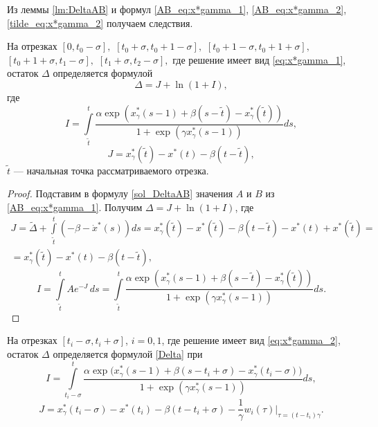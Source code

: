Из леммы \eqref{lm:DeltaAB} и формул \eqref{AB_eq:x*gamma_1}, \eqref{AB_eq:x*gamma_2}, \eqref{tilde_eq:x*gamma_2} получаем следствия.
\begin{corollary}\label{corol_Delta_long}
На отрезках $[0, t_0-\sigma],$ $[t_0+\sigma, t_0+1-\sigma],$ $[t_0+1-\sigma, t_0+1+\sigma],$ $[t_0+1+\sigma, t_1-\sigma],$ $[t_1+\sigma,t_2-\sigma],$ где решение имеет вид \eqref{eq:x*gamma_1}, остаток $\Delta$ определяется формулой
\begin{equation}
    \label{Delta}
    \Delta = J + \ln(1 + I),
\end{equation}
где 
\begin{equation}
    \label{I_long}
    I = \int\limits_{\tilde{t}}^{t}\frac{\alpha\exp(x_{\gamma}^*(s-1)+\beta(s-\tilde{t})-x_{\gamma}^*(\tilde{t}))}{1 + \exp(\gamma x_{\gamma}^*(s-1))} ds,
\end{equation}
%
\begin{equation}\label{J_long}
    J = x_{\gamma}^*(\tilde{t}) - x^*(t) - \beta(t - \tilde{t}),
\end{equation}
%
$\tilde{t}$ --- начальная точка рассматриваемого отрезка.
\end{corollary}
%
\begin{proof}
	Подставим в формулу \eqref{sol_DeltaAB} значения $A$ и $B$ из \eqref{AB_eq:x*gamma_1}. Получим $\Delta = J + \ln(1 + I)$, где
\begin{multline*}
	J = \tilde{\Delta} + \int\limits_{\tilde{t}}^{t}(-\beta - \dot{x}^*(s))ds = x_{\gamma}^*(\tilde{t}) - x^*(\tilde{t}) - \beta(t - \tilde{t}) - x^*(t) + x^*(\tilde{t}) =\\= x_{\gamma}^*(\tilde{t}) - x^*(t) - \beta(t - \tilde{t}),
\end{multline*}
\[
	I = \int\limits_{\tilde{t}}^{t} A e^{-J} \, ds = \int\limits_{\tilde{t}}^{t}\frac{\alpha\exp(x_{\gamma}^*(s-1)+\beta(s-\tilde{t})-x_{\gamma}^*(\tilde{t}))}{1 + \exp(\gamma x_{\gamma}^*(s-1))} ds.
\]
\end{proof}
%
\begin{corollary}\label{corol_Delta_short}
На отрезках $[t_i-\sigma,t_i+\sigma]$, $i=0, 1$, где решение имеет вид \eqref{eq:x*gamma_2}, остаток $\Delta$ определяется формулой \eqref{Delta} при
 \begin{equation}
    \label{I_point}
   I=\int\limits_{t_i-\sigma}^{t}\frac{\alpha\exp\big(x_{\gamma}^*(s-1)+\beta(s-t_i+\sigma)-x_{\gamma}^*(t_i-\sigma)\big)}{1+\exp(\gamma x_{\gamma}^*(s-1))}ds,
\end{equation}
%
\begin{equation}
    \label{J_point}
    J=x_{\gamma}^*(t_i - \sigma) - x^*(t_i) - \beta(t-t_i+\sigma) - \frac{1}{\gamma} w_i(\tau)|_{\tau=(t-t_i)\gamma}.
\end{equation}
\end{corollary}
